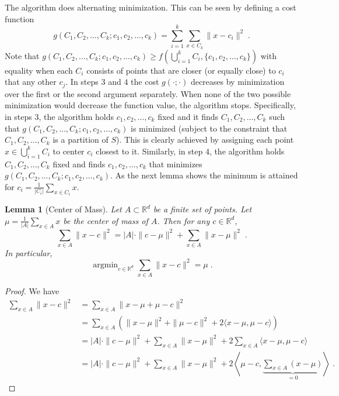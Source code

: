 \documentclass[9pt]{article}
\newtheorem{lemma}{Lemma}
\newcommand{\R}{\mathbb{R}}
\newcommand{\norm}[1]{\|{#1}\|}
\DeclareMathOperator*{\argmin}{argmin}
\begin{document}
The algorithm does alternating minimization.  This can be seen by defining a cost
function
$$
g(C_1, C_2, \dots, C_k; c_1, c_2, \dots, c_k) = \sum_{i=1}^k \sum_{x \in C_k} \norm{x - c_i}^2 \; .
$$
Note that $g(C_1, C_2, \dots, C_k; c_1, c_2, \dots, c_k) \ge f(\bigcup_{i=1}^k
C_i, \{c_1, c_2, \dots, c_k\})$ with equality when each $C_i$ consists of
points that are closer (or equally close) to $c_i$ that any other $c_j$. In
steps $3$ and $4$ the cost $g(\cdot;\cdot)$ decreases by minimization over the
first or the second argument separately.  When none of the two possible
minimization would decrease the function value, the algorithm stops.
Specifically, in steps $3$, the algorithm holds $c_1, c_2, \dots, c_k$ fixed
and it finds $C_1, C_2, \dots, C_k$ such that $g(C_1, C_2, \dots, C_k; c_1,
c_2, \dots, c_k)$ is minimized (subject to the constraint that $C_1, C_2,
\dots, C_k$ is a partition of $S$). This is clearly achieved by assigning each
point $x \in \bigcup_{i=1}^k C_i$ to center $c_i$ closest to it. Similarly, in
step $4$, the algorithm holds $C_1, C_2, \dots, C_k$ fixed and finds $c_1, c_2,
\dots, c_k$ that minimizes $g(C_1, C_2, \dots, C_k; c_1, c_2, \dots, c_k)$.  As
the next lemma shows the minimum is attained for $c_i = \frac{1}{|C_i|} \sum_{x
\in C_i} x$.

\begin{lemma}[Center of Mass]
\label{lemma:center-of-mass}
Let $A \subset \R^d$ be a finite set of points. Let $\mu = \frac{1}{|A|}
\sum_{x \in A} x$ be the center of mass of $A$. Then for any $c \in \R^d$,
$$
\sum_{x \in A} \norm{x - c}^2 = |A| \cdot \norm{c - \mu}^2 + \sum_{x \in A} \norm{x - \mu}^2 \; .
$$
In particular,
$$
\argmin_{c \in \R^d} \sum_{x \in A} \norm{x - c}^2 = \mu \; .
$$
\end{lemma}

\begin{proof}
We have
\begin{align*}
\sum_{x \in A} \norm{x - c}^2
& = \sum_{x \in A} \norm{x - \mu + \mu - c}^2 \\
& = \sum_{x \in A} \left( \norm{x - \mu}^2  + \norm{\mu - c}^2 + 2 \langle x - \mu, \mu - c \rangle \right) \\
& = |A| \cdot \norm{c - \mu}^2 +  \sum_{x \in A} \norm{x - \mu}^2  + 2 \sum_{x \in A} \langle x - \mu, \mu - c \rangle \\
& = |A| \cdot \norm{c - \mu}^2 +  \sum_{x \in A} \norm{x - \mu}^2  + 2 \left\langle \mu - c,  \underbrace{\sum_{x \in A} (x - \mu)}_{=0} \right\rangle \; .
\end{align*}
\end{proof}
\end{document}
